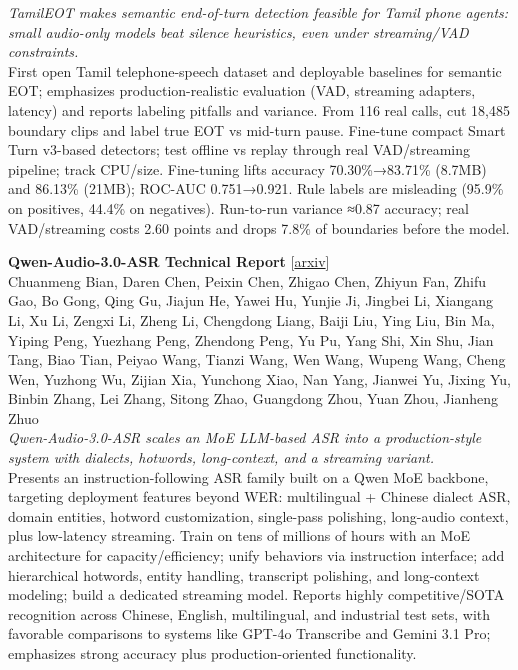 \documentclass[12pt,letterpaper]{article}
\begin{document}
{\small\textit{TamilEOT makes semantic end-of-turn detection feasible for Tamil phone agents: small audio-only models beat silence heuristics, even under streaming/VAD constraints.}}\\[1pt]
{\footnotesize First open Tamil telephone-speech dataset and deployable baselines for semantic EOT; emphasizes production-realistic evaluation (VAD, streaming adapters, latency) and reports labeling pitfalls and variance. From 116 real calls, cut 18,485 boundary clips and label true EOT vs mid-turn pause. Fine-tune compact Smart Turn v3-based detectors; test offline vs replay through real VAD/streaming pipeline; track CPU/size. Fine-tuning lifts accuracy 70.30\%→83.71\% (8.7MB) and 86.13\% (21MB); ROC-AUC 0.751→0.921. Rule labels are misleading (95.9\% on positives, 44.4\% on negatives). Run-to-run variance ≈0.87 accuracy; real VAD/streaming costs 2.60 points and drops 7.8\% of boundaries before the model.}

\medskip

{\small\textbf{Qwen-Audio-3.0-ASR Technical Report}} {\scriptsize[\href{https://arxiv.org/abs/2609.07549}{arxiv}]}\\
{\scriptsize Chuanmeng Bian, Daren Chen, Peixin Chen, Zhigao Chen, Zhiyun Fan, Zhifu Gao, Bo Gong, Qing Gu, Jiajun He, Yawei Hu, Yunjie Ji, Jingbei Li, Xiangang Li, Xu Li, Zengxi Li, Zheng Li, Chengdong Liang, Baiji Liu, Ying Liu, Bin Ma, Yiping Peng, Yuezhang Peng, Zhendong Peng, Yu Pu, Yang Shi, Xin Shu, Jian Tang, Biao Tian, Peiyao Wang, Tianzi Wang, Wen Wang, Wupeng Wang, Cheng Wen, Yuzhong Wu, Zijian Xia, Yunchong Xiao, Nan Yang, Jianwei Yu, Jixing Yu, Binbin Zhang, Lei Zhang, Sitong Zhao, Guangdong Zhou, Yuan Zhou, Jianheng Zhuo}\\

{\small\textit{Qwen-Audio-3.0-ASR scales an MoE LLM-based ASR into a production-style system with dialects, hotwords, long-context, and a streaming variant.}}\\[1pt]
{\footnotesize Presents an instruction-following ASR family built on a Qwen MoE backbone, targeting deployment features beyond WER: multilingual + Chinese dialect ASR, domain entities, hotword customization, single-pass polishing, long-audio context, plus low-latency streaming. Train on tens of millions of hours with an MoE architecture for capacity/efficiency; unify behaviors via instruction interface; add hierarchical hotwords, entity handling, transcript polishing, and long-context modeling; build a dedicated streaming model. Reports highly competitive/SOTA recognition across Chinese, English, multilingual, and industrial test sets, with favorable comparisons to systems like GPT-4o Transcribe and Gemini 3.1 Pro; emphasizes strong accuracy plus production-oriented functionality.}
\end{document}
